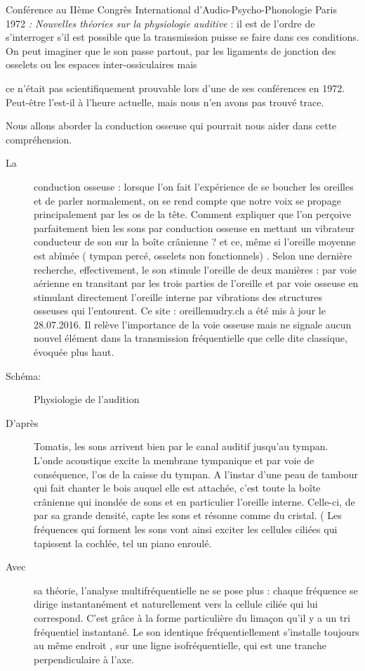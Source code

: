 \documentclass[12pt,french]{report}
\makeatletter
\let\SF@@footnote\footnote
\def\footnote{\ifx\protect\@typeset@protect
    \expandafter\SF@@footnote
  \else
    \expandafter\SF@gobble@opt
  \fi
}
\edef\SF@gobble@opt{\noexpand\protect
  \expandafter\noexpand\csname SF@gobble@opt \endcsname}
\makeatother
\begin{document}
\footnote{Conférence au IIème Congrès International d'Audio-Psycho-Phonologie
Paris 1972 \emph{: Nouvelles théories sur la physiologie auditive}} : il est de l'ordre de s'interroger s'il est possible que la transmission
puisse se faire dans ces conditions. On peut imaginer que le son passe
partout, par les ligaments de jonction des osselets ou les espaces
inter-ossiculaires mais

ce n'était pas scientifiquement prouvable lors d'une de ses conférences
en 1972. Peut-être l'est-il à l'heure actuelle, mais nous n'en avons
pas trouvé trace. 

Nous allons aborder la conduction osseuse qui pourrait nous aider
dans cette compréhension.
\begin{description}
\item [{La}] conduction osseuse : lorsque l'on fait l'expérience de se
boucher les oreilles et de parler normalement, on se rend compte que
notre voix se propage principalement par les os de la tête. Comment
expliquer que l'on perçoive parfaitement bien les sons par conduction
osseuse en mettant un vibrateur conducteur de son sur la boîte crânienne
? et ce, même si l'oreille moyenne est abîmée ( tympan percé, osselets
non fonctionnels) . Selon une dernière recherche, effectivement, le
son stimule l'oreille de deux manières : par voie aérienne en transitant
par les trois parties de l'oreille et par voie osseuse en stimulant
directement l'oreille interne par vibrations des structures osseuses
qui l'entourent. Ce site : oreillemudry.ch a été mis à jour le 28.07.2016.
Il relève l'importance de la voie osseuse mais ne signale aucun nouvel
élément dans la transmission fréquentielle que celle dite classique,
évoquée plus haut. 
\item [{Schéma:}] Physiologie de l\textquoteright audition 
\item [{D'après}] Tomatis, les sons arrivent bien par le canal auditif
jusqu'au tympan. L'onde acoustique excite la membrane tympanique et
par voie de conséquence, l'os de la caisse du tympan. A l'instar d'une
peau de tambour qui fait chanter le bois auquel elle est attachée,
c'est toute la boîte crânienne qui inondée de sons et en particulier
l'oreille interne. Celle-ci, de par sa grande densité, capte les sons
et résonne comme du cristal. (
Les fréquences qui forment les sons vont ainsi exciter les cellules
ciliées qui tapissent la cochlée, tel un piano enroulé. 
\item [{Avec}] sa théorie, l'analyse multifréquentielle ne se pose plus
: chaque fréquence se dirige instantanément et naturellement\emph{
}vers la cellule ciliée qui lui correspond. C'est grâce à la forme
particulière\emph{ }du limaçon qu'il y a un tri fréquentiel instantané.
Le son identique fréquentiellement s'installe toujours au même endroit
, sur une ligne isofréquentielle, qui est une tranche perpendiculaire
à l'axe.
\end{description}
\end{document}
